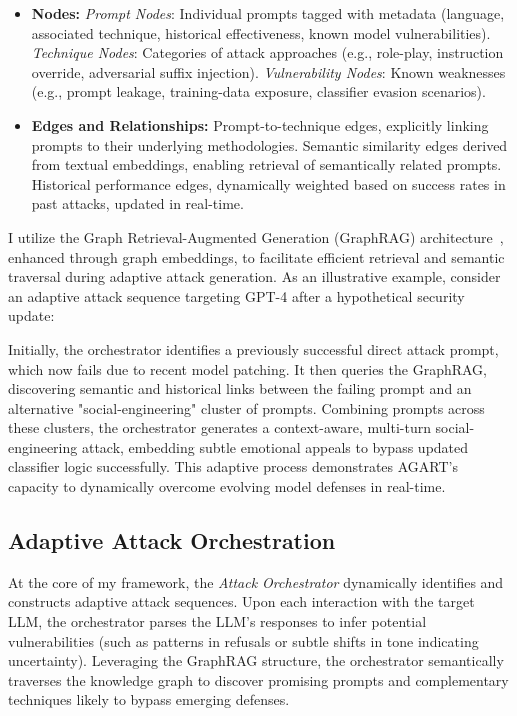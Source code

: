 \begin{itemize}
    \item \textbf{Nodes:} \emph{Prompt Nodes}: Individual prompts tagged with metadata (language, associated technique, historical effectiveness, known model vulnerabilities). \emph{Technique Nodes}: Categories of attack approaches (e.g., role-play, instruction override, adversarial suffix injection). \emph{Vulnerability Nodes}: Known weaknesses (e.g., prompt leakage, training-data exposure, classifier evasion scenarios).
    \item \textbf{Edges and Relationships:} Prompt-to-technique edges, explicitly linking prompts to their underlying methodologies. Semantic similarity edges derived from textual embeddings, enabling retrieval of semantically related prompts. Historical performance edges, dynamically weighted based on success rates in past attacks, updated in real-time.
\end{itemize}

I utilize the Graph Retrieval-Augmented Generation (GraphRAG) architecture~\cite{peng2024graph}, enhanced through graph embeddings, to facilitate efficient retrieval and semantic traversal during adaptive attack generation. As an illustrative example, consider an adaptive attack sequence targeting GPT-4 after a hypothetical security update:

Initially, the orchestrator identifies a previously successful direct attack prompt, which now fails due to recent model patching. It then queries the GraphRAG, discovering semantic and historical links between the failing prompt and an alternative "social-engineering" cluster of prompts. Combining prompts across these clusters, the orchestrator generates a context-aware, multi-turn social-engineering attack, embedding subtle emotional appeals to bypass updated classifier logic successfully. This adaptive process demonstrates AGART’s capacity to dynamically overcome evolving model defenses in real-time.

\subsection{Adaptive Attack Orchestration}

At the core of my framework, the \textit{Attack Orchestrator} dynamically identifies and constructs adaptive attack sequences. Upon each interaction with the target LLM, the orchestrator parses the LLM’s responses to infer potential vulnerabilities (such as patterns in refusals or subtle shifts in tone indicating uncertainty). Leveraging the GraphRAG structure, the orchestrator semantically traverses the knowledge graph to discover promising prompts and complementary techniques likely to bypass emerging defenses.

